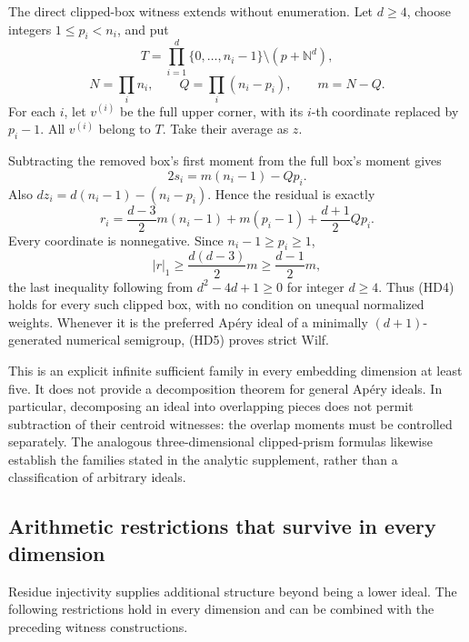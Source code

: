 \documentclass[
  11pt,
  a4paper,
]{article}
\begin{document}
The direct clipped-box witness extends without enumeration. Let
\(d\ge4\), choose integers \(1\le p_i<n_i\), and put \[
T=\prod_{i=1}^d\{0,\ldots,n_i-1\}\setminus(p+\mathbb N^d),
\] \[
N=\prod_i n_i,\qquad Q=\prod_i(n_i-p_i),\qquad m=N-Q.
\] For each \(i\), let \(v^{(i)}\) be the full upper corner, with its
\(i\)-th coordinate replaced by \(p_i-1\). All \(v^{(i)}\) belong to
\(T\). Take their average as \(z\).

Subtracting the removed box's first moment from the full box's moment
gives \[
2s_i=m(n_i-1)-Qp_i.
\] Also \(dz_i=d(n_i-1)-(n_i-p_i)\). Hence the residual is exactly \[
\boxed{
r_i=\frac{d-3}{2}m(n_i-1)+m(p_i-1)
       +\frac{d+1}{2}Qp_i.}
\tag{HD9}
\] Every coordinate is nonnegative. Since \(n_i-1\ge p_i\ge1\), \[
|r|_1\ge\frac{d(d-3)}2m\ge\frac{d-1}{2}m,
\] the last inequality following from \(d^2-4d+1\ge0\) for integer
\(d\ge4\). Thus (HD4) holds for every such clipped box, with no
condition on unequal normalized weights. Whenever it is the preferred
Apéry ideal of a minimally \((d+1)\)-generated numerical semigroup,
(HD5) proves strict Wilf.

This is an explicit infinite sufficient family in every embedding
dimension at least five. It does not provide a decomposition theorem for
general Apéry ideals. In particular, decomposing an ideal into
overlapping pieces does not permit subtraction of their centroid
witnesses: the overlap moments must be controlled separately. The
analogous three-dimensional clipped-prism formulas likewise establish
the families stated in the analytic supplement, rather than a
classification of arbitrary ideals.

\hypertarget{arithmetic-restrictions-that-survive-in-every-dimension}{%
\subsection{Arithmetic restrictions that survive in every
dimension}\label{arithmetic-restrictions-that-survive-in-every-dimension}}

Residue injectivity supplies additional structure beyond being a lower
ideal. The following restrictions hold in every dimension and can be
combined with the preceding witness constructions.
\end{document}
